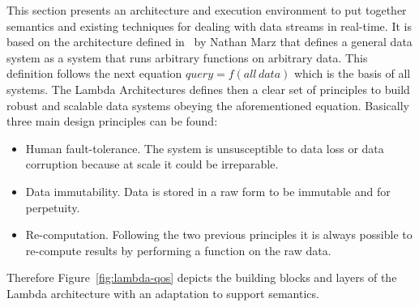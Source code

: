 This section presents an architecture and execution environment to put together 
semantics and existing techniques for dealing with data streams in real-time. 
It is based on the architecture defined in~\cite{BigDataManing} by Nathan Marz that defines 
a general data system as a system that runs arbitrary functions on arbitrary data. This definition 
follows the next equation $query=f(all\,data)$ which is the basis of all systems. The Lambda 
Architectures defines then a clear set of principles to build robust and scalable data 
systems obeying the aforementioned equation. Basically three main design principles 
can be found:
\begin{itemize}
 \item Human fault-tolerance. The system is unsusceptible to data loss or data corruption because at scale it could be irreparable.
 \item Data immutability. Data is stored in a raw form to be immutable and for perpetuity.
 \item Re-computation. Following the two previous principles it is always possible 
 to re-compute results by performing a function on the raw data.
\end{itemize}

Therefore Figure~\ref{fig:lambda-qos} depicts the building blocks and layers of the Lambda architecture with 
an adaptation to support semantics. 

